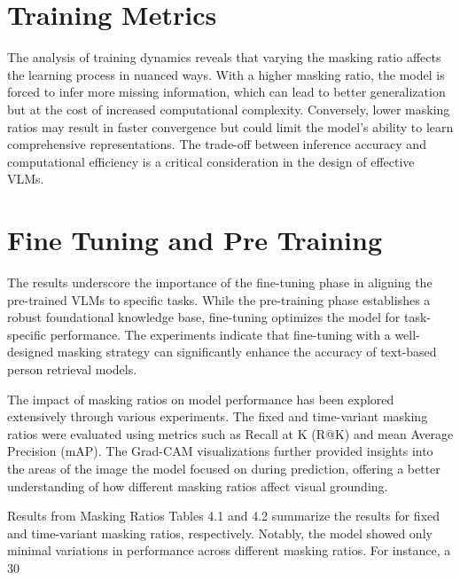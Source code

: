 \section{Training Metrics}

The analysis of training dynamics reveals that varying the masking ratio affects the learning process in nuanced ways. With a higher masking ratio, the model is forced to infer more missing information, which can lead to better generalization but at the cost of increased computational complexity. Conversely, lower masking ratios may result in faster convergence but could limit the model's ability to learn comprehensive representations. The trade-off between inference accuracy and computational efficiency is a critical consideration in the design of effective VLMs.


\section{Fine Tuning and Pre Training}

The results underscore the importance of the fine-tuning phase in aligning the pre-trained VLMs to specific tasks. While the pre-training phase establishes a robust foundational knowledge base, fine-tuning optimizes the model for task-specific performance. The experiments indicate that fine-tuning with a well-designed masking strategy can significantly enhance the accuracy of text-based person retrieval models.





The impact of masking ratios on model performance has been explored extensively through various experiments. The fixed and time-variant masking ratios were evaluated using metrics such as Recall at K (R@K) and mean Average Precision (mAP). The Grad-CAM visualizations further provided insights into the areas of the image the model focused on during prediction, offering a better understanding of how different masking ratios affect visual grounding.

Results from Masking Ratios
Tables 4.1 and 4.2 summarize the results for fixed and time-variant masking ratios, respectively. Notably, the model showed only minimal variations in performance across different masking ratios. For instance, a 30%

